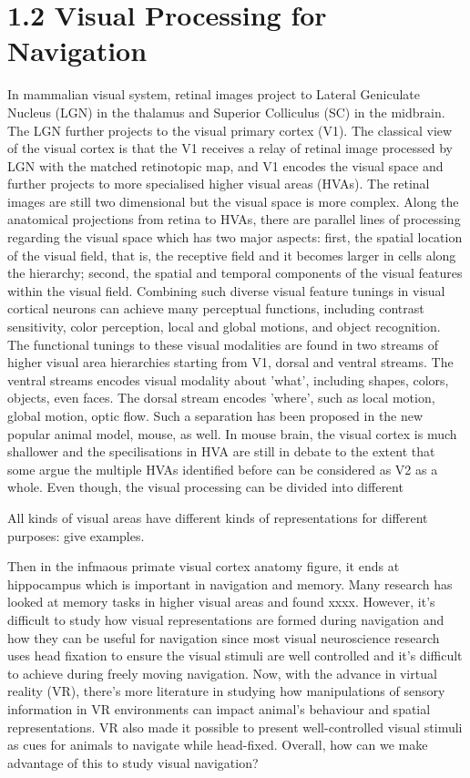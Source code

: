 \section{1.2 Visual Processing for Navigation}
In mammalian visual system,  retinal images project to Lateral Geniculate Nucleus (LGN) in the thalamus and Superior Colliculus (SC) in the midbrain. The LGN further projects to the visual primary cortex (V1). The classical view of the visual cortex is that the V1 receives a relay of retinal image processed by LGN with the matched retinotopic map, and V1 encodes the visual space and further projects to more specialised higher visual areas (HVAs). The retinal images are still two dimensional but the visual space is more complex. Along the anatomical projections from retina to HVAs, there are parallel lines of processing regarding the visual space which has two major aspects: first, the spatial location of the visual field, that is, the receptive field and it becomes larger in cells along the hierarchy; second, the spatial and temporal components of the visual features within the visual field. Combining such diverse visual feature tunings in visual cortical neurons can achieve many perceptual functions, including contrast sensitivity, color perception, local and global motions, and object recognition. The functional tunings to these visual modalities are found in two streams of higher visual area hierarchies starting from V1, dorsal and ventral streams. The ventral streams encodes visual modality about 'what', including shapes, colors, objects, even faces. The dorsal stream encodes 'where', such as local motion, global motion, optic flow. Such a separation has been proposed in the new popular animal model, mouse, as well. In mouse brain, the visual cortex is much shallower and the specilisations in HVA are still in debate to the extent that some argue the multiple HVAs identified before can be considered as V2 as a whole. Even though, the visual processing can be divided into different 



All kinds of visual areas have different kinds of representations for different purposes: give examples.

Then in the infmaous primate visual cortex anatomy figure, it ends at hippocampus which is important in navigation and memory. Many research has looked at memory tasks in higher visual areas and found xxxx.
However, it's difficult to study how visual representations are formed during navigation and how they can be useful for navigation since most visual neuroscience research uses head fixation to ensure the visual stimuli are well controlled and it's difficult to achieve during freely moving navigation. Now, with the advance in virtual reality (VR), there's more literature in studying how manipulations of sensory information in VR environments can impact animal's behaviour and spatial representations. VR also made it possible to present well-controlled visual stimuli as cues for animals to navigate while head-fixed. Overall, how can we make advantage of this to study visual navigation?

